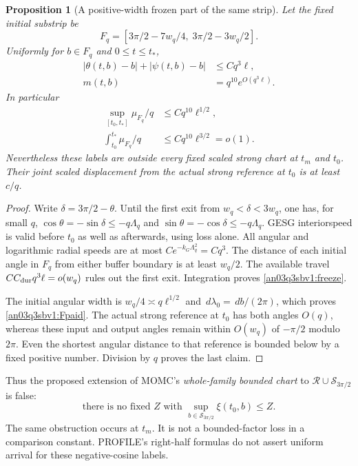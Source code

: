 \documentclass[11pt]{article}
\numberwithin{equation}{section}
\newtheorem{proposition}{Proposition}[section]
\theoremstyle{remark}\newtheorem{remark}[proposition]{Remark}
\newcommand{\dd}{\,d}
\newcommand{\Sm}{\mathcal S}
\begin{document}
\begin{proposition}[A positive-width frozen part of the same strip]
\label{an03q3sbv1:frozen}
Let the fixed initial substrip be
\[
 F_q=[3\pi/2-7w_q/4,\;3\pi/2-3w_q/2].
\]
Uniformly for $b\in F_q$ and $0\le t\le t_*$,
\begin{align}
 |\theta(t,b)-b|+|\psi(t,b)-b|&\le Cq^3\ell,\nonumber\\
 m(t,b)&=q^{10}e^{O(q^3\ell)}.                    \label{an03q3sbv1:freeze}
\end{align}
In particular
\begin{align}
 \sup_{[t_0,t_*]}\mu_{F_q}/q&\le Cq^{10}\ell^{1/2},\nonumber\\
 \int_{t_0}^{t_*}\mu_{F_q}/q&\le Cq^{10}\ell^{3/2}=o(1).
                                                        \label{an03q3sbv1:Fpaid}
\end{align}
Nevertheless these labels are outside every fixed scaled strong chart
at $t_m$ and $t_0$. Their joint scaled displacement from the actual
strong reference at $t_0$ is at least $c/q$.
\end{proposition}
\begin{proof}
Write $\delta=3\pi/2-\theta$. Until the first exit from
$w_q<\delta<3w_q$, one has, for small $q$,
$\cos\theta=-\sin\delta\le-q\Lambda_q$ and
$\sin\theta=-\cos\delta\le-q\Lambda_q$.
GESG interiorspeed is valid before $t_0$ as well as afterwards,
using loss alone. All angular and logarithmic radial speeds
are at most
$C e^{-k_G\Lambda_q^2}=Cq^3$.
The distance of each initial angle in $F_q$ from either buffer
boundary is at least $w_q/2$. The available travel
$CC_{\rm dur}q^3\ell=o(w_q)$ rules out the first exit.
Integration proves \eqref{an03q3sbv1:freeze}.

The initial angular width is $w_q/4\asymp q\ell^{1/2}$ and
$\dd\lambda_0=\dd b/(2\pi)$, which proves \eqref{an03q3sbv1:Fpaid}.
The actual strong reference at $t_0$ has both angles $O(q)$,
whereas these input and output angles remain within $O(w_q)$
of $-\pi/2$ modulo $2\pi$. Even the shortest angular distance
to that reference is bounded below by a fixed positive number.
Division by $q$ proves the last claim.
\end{proof}

Thus the proposed extension of MOMC's \emph{whole-family bounded chart}
to $\mathcal R\cup\Sm_{3\pi/2}$ is false:
\begin{equation}
 \text{there is no fixed }Z\text{ with }
 \sup_{b\in\Sm_{3\pi/2}}\xi(t_0,b)\le Z .
 \label{an03q3sbv1:falsechart}
\end{equation}
The same obstruction occurs at $t_m$. It is not a bounded-factor
loss in a comparison constant. PROFILE's right-half formulas do not
assert uniform arrival for these negative-cosine labels.
\end{document}

